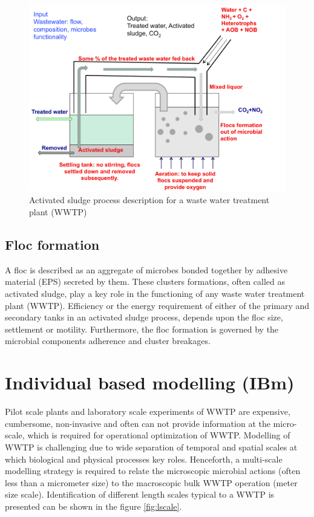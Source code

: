 \documentclass[11pt,a4paper,openright]{article}
\begin{document}
\begin{figure}[!htb]
\begin{center}
  \includegraphics[width=0.75\columnwidth]{Figs/ASP.png}
\caption{Activated sludge process description for a waste water treatment plant (WWTP)}
\label{fig:ASP}       %
\end{center}
\end{figure} 


\subsection{Floc formation}
A floc is described as an aggregate of microbes bonded together by adhesive material (EPS) secreted by them. These clusters formations, often called as activated sludge, play a key role in the functioning of any waste water treatment plant (WWTP). Efficiency or the energy requirement of either of the primary and secondary tanks in an activated sludge process, depends upon the floc size, settlement or motility. Furthermore, the floc formation is governed by the microbial components adherence and cluster breakages.

\section{Individual based modelling (IBm)}
Pilot scale plants and laboratory scale experiments of WWTP are expensive, cumbersome, non-invasive and often can not provide information at the micro-scale, which is required for operational optimization of WWTP. Modelling of WWTP is challenging due to wide separation of temporal and spatial scales at which biological and physical processes key roles. Henceforth, a multi-scale modelling strategy is required to relate the microscopic microbial actions (often less than a micrometer size) to the macroscopic bulk WWTP operation (meter size scale). Identification of different length scales typical to a WWTP is presented can be shown in the figure \ref{fig:lscale}.  
\end{document}
